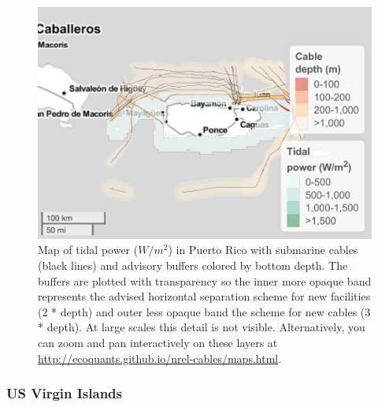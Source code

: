\documentclass[]{article}
\begin{document}
\begin{figure}
\centering
\includegraphics{report_files/figure-latex/mapTidePuertoRico-1.pdf}
\caption{\label{fig:mapTidePuertoRico}Map of tidal power (\(W/m^2\)) in
Puerto Rico with submarine cables (black lines) and advisory buffers
colored by bottom depth. The buffers are plotted with transparency so
the inner more opaque band represents the advised horizontal separation
scheme for new facilities (2 * depth) and outer less opaque band the
scheme for new cables (3 * depth). At large scales this detail is not
visible. Alternatively, you can zoom and pan interactively on these
layers at \url{http://ecoquants.github.io/nrel-cables/maps.html}.}
\end{figure}

\hypertarget{us-virgin-islands}{%
\subsubsection{US Virgin Islands}\label{us-virgin-islands}}
\end{document}

